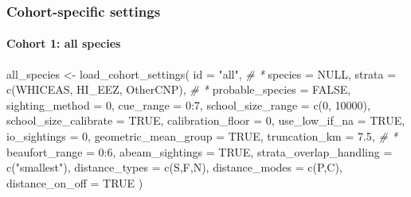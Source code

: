 \documentclass[
]{book}
\newenvironment{Shaded}{\begin{snugshade}}{\end{snugshade}}
\newcommand{\AttributeTok}[1]{\textcolor[rgb]{0.77,0.63,0.00}{#1}}
\newcommand{\CommentTok}[1]{\textcolor[rgb]{0.56,0.35,0.01}{\textit{#1}}}
\newcommand{\ConstantTok}[1]{\textcolor[rgb]{0.00,0.00,0.00}{#1}}
\newcommand{\DecValTok}[1]{\textcolor[rgb]{0.00,0.00,0.81}{#1}}
\newcommand{\FloatTok}[1]{\textcolor[rgb]{0.00,0.00,0.81}{#1}}
\newcommand{\FunctionTok}[1]{\textcolor[rgb]{0.00,0.00,0.00}{#1}}
\newcommand{\NormalTok}[1]{#1}
\newcommand{\OtherTok}[1]{\textcolor[rgb]{0.56,0.35,0.01}{#1}}
\newcommand{\SpecialCharTok}[1]{\textcolor[rgb]{0.00,0.00,0.00}{#1}}
\newcommand{\StringTok}[1]{\textcolor[rgb]{0.31,0.60,0.02}{#1}}
\begin{document}
\hypertarget{cohort-specific-settings-1}{%
\subsubsection*{Cohort-specific settings}\label{cohort-specific-settings-1}}

\hypertarget{cohort-1-all-species}{%
\paragraph*{Cohort 1: all species}\label{cohort-1-all-species}}

\begin{Shaded}
\begin{Highlighting}[]
\NormalTok{all\_species }\OtherTok{\textless{}{-}} \FunctionTok{load\_cohort\_settings}\NormalTok{(}
  \AttributeTok{id =} \StringTok{"all"}\NormalTok{, }\CommentTok{\# *}
  \AttributeTok{species =} \ConstantTok{NULL}\NormalTok{, }
  \AttributeTok{strata =} \FunctionTok{c}\NormalTok{(}\StringTok{\textquotesingle{}WHICEAS\textquotesingle{}}\NormalTok{, }\StringTok{\textquotesingle{}HI\_EEZ\textquotesingle{}}\NormalTok{, }\StringTok{\textquotesingle{}OtherCNP\textquotesingle{}}\NormalTok{), }\CommentTok{\# *}
  \AttributeTok{probable\_species =} \ConstantTok{FALSE}\NormalTok{,}
  \AttributeTok{sighting\_method =} \DecValTok{0}\NormalTok{,}
  \AttributeTok{cue\_range =} \DecValTok{0}\SpecialCharTok{:}\DecValTok{7}\NormalTok{,}
  \AttributeTok{school\_size\_range =} \FunctionTok{c}\NormalTok{(}\DecValTok{0}\NormalTok{, }\DecValTok{10000}\NormalTok{),}
  \AttributeTok{school\_size\_calibrate =} \ConstantTok{TRUE}\NormalTok{,}
  \AttributeTok{calibration\_floor =} \DecValTok{0}\NormalTok{,}
  \AttributeTok{use\_low\_if\_na =} \ConstantTok{TRUE}\NormalTok{,}
  \AttributeTok{io\_sightings =} \DecValTok{0}\NormalTok{,}
  \AttributeTok{geometric\_mean\_group =} \ConstantTok{TRUE}\NormalTok{,}
  \AttributeTok{truncation\_km =} \FloatTok{7.5}\NormalTok{, }\CommentTok{\# *}
  \AttributeTok{beaufort\_range =} \DecValTok{0}\SpecialCharTok{:}\DecValTok{6}\NormalTok{,}
  \AttributeTok{abeam\_sightings =} \ConstantTok{TRUE}\NormalTok{,}
  \AttributeTok{strata\_overlap\_handling =} \FunctionTok{c}\NormalTok{(}\StringTok{"smallest"}\NormalTok{),}
  \AttributeTok{distance\_types =} \FunctionTok{c}\NormalTok{(}\StringTok{\textquotesingle{}S\textquotesingle{}}\NormalTok{,}\StringTok{\textquotesingle{}F\textquotesingle{}}\NormalTok{,}\StringTok{\textquotesingle{}N\textquotesingle{}}\NormalTok{),}
  \AttributeTok{distance\_modes =} \FunctionTok{c}\NormalTok{(}\StringTok{\textquotesingle{}P\textquotesingle{}}\NormalTok{,}\StringTok{\textquotesingle{}C\textquotesingle{}}\NormalTok{),}
  \AttributeTok{distance\_on\_off =} \ConstantTok{TRUE}
\NormalTok{)}
\end{Highlighting}
\end{Shaded}
\end{document}
